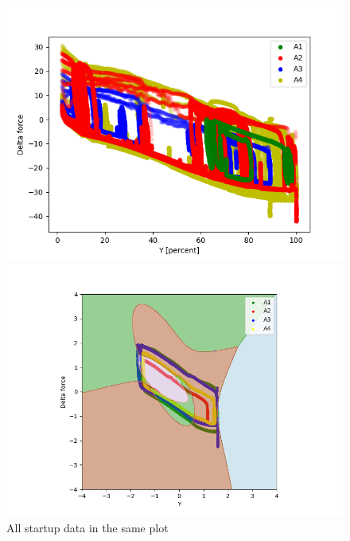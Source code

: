             \begin{figure}[]
                \begin{minipage}[b]{0.48\linewidth}
                    \centering
                    \includegraphics[width = \textwidth]{figures/analysis/startuponeplot.png}
                    \caption*{All startup data in the same plot }
                \end{minipage}
                \hfill
                \begin{minipage}[b]{0.48\linewidth}
                    \centering
                    \includegraphics[width = \textwidth]{figures/analysis/logistic_regression/No_Servo_Logistic_Regression_degree3.png}

\end{minipage}
\end{figure}
